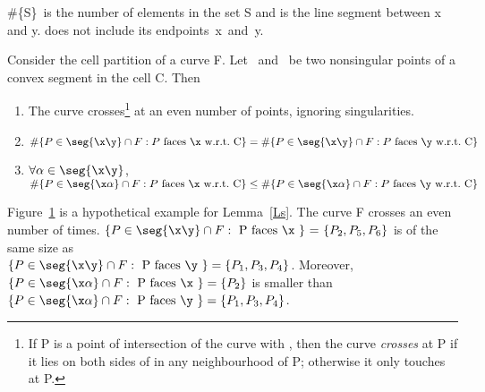 \begin{notation}
\#\{S\}\ is the number of elements in the set S and
 is the line segment between x and y.
 does not include its \mbox{endpoints x and y}.
\end{notation}


\begin{lemma}
\label{Ls}
Consider the cell partition of a curve F.
Let \x\ and \y\ be two nonsingular points of a convex segment in the cell C.
Then
\begin{enumerate}
\item The curve crosses\footnote{If P is a point of intersection of the curve 
	with \seg{\x\y}, then the curve {\em crosses} \seg{\x\y} at P if it lies 
	on both sides of \seg{\x\y} in any neighbourhood of P; otherwise it 
	only touches \seg{\x\y} at P.}
\seg{\x\y} at an even number of points, ignoring singularities.
\item $\#\{P \in \seg{\x\y} \cap F: P \mbox{ faces \x\ w.r.t.\ C}\} = 
\#\{P \in \seg{\x\y} \cap F: P \mbox{ faces \y\ w.r.t.\ C}\}$
\item $\forall \alpha \in \seg{\x\y}$,\ \ \nopagebreak
$\#\{P \in\seg{\x\alpha}\cap F: P \mbox{ faces \x\ w.r.t.\ C}\} \leq 
\#\{P \in \seg{\x\alpha}\cap F: P \mbox{ faces \y\ w.r.t.\ C}\} $
\end{enumerate}
\end{lemma}
%
\begin{example}
Figure~\ref{4} is a hypothetical example for Lemma~\ref{Ls}.
The curve F crosses \seg{\x\y} an even number of times.
$\{ P \in \seg{\x\y} \cap F:\mbox{ P faces \x\ \} = \{}P_{2},P_{5},P_{6}\}$
is of the same size as \\
$\{ P \in \seg{\x\y} \cap F:\mbox{ P faces \y } \} = \{P_{1},P_{3},P_{4}\}$.
Moreover,
$\{ P \in \seg{\x\alpha} \cap F: \mbox{ P faces \x } \} = \{P_{2}\}$
is smaller than
$\{ P \in \seg{\x\alpha} \cap F: \mbox{ P faces \y } \} = \{P_{1},P_{3},P_{4}\}$.
\end{example}
%
\begin{figure}[htbp]\vspace{2.25in}\caption{}\label{4}\end{figure}
%

